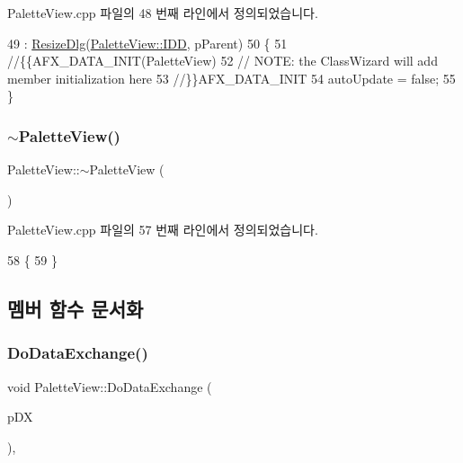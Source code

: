 Palette\+View.\+cpp 파일의 48 번째 라인에서 정의되었습니다.


\begin{DoxyCode}
49   : \mbox{\hyperlink{class_resize_dlg_a87bab778e9312f274ebe750d4c3a67ee}{ResizeDlg}}(\mbox{\hyperlink{class_palette_view_ac9e3b15a860a96ff9e01c7eb81030460a9cd7f0493230e0cee8b5dcc10a142e4d}{PaletteView::IDD}}, pParent)
50 \{
51   \textcolor{comment}{//\{\{AFX\_DATA\_INIT(PaletteView)}
52   \textcolor{comment}{// NOTE: the ClassWizard will add member initialization here}
53   \textcolor{comment}{//\}\}AFX\_DATA\_INIT}
54   autoUpdate = \textcolor{keyword}{false};
55 \}
\end{DoxyCode}
\mbox{\label{class_palette_view_a8b61805ccbde12bb0494801ec2b54c69}} 
\subsubsection{\texorpdfstring{$\sim$\+Palette\+View()}{~PaletteView()}}
{\footnotesize\ttfamily Palette\+View\+::$\sim$\+Palette\+View (\begin{DoxyParamCaption}{ }\end{DoxyParamCaption})}



Palette\+View.\+cpp 파일의 57 번째 라인에서 정의되었습니다.


\begin{DoxyCode}
58 \{
59 \}
\end{DoxyCode}


\subsection{멤버 함수 문서화}
\mbox{\label{class_palette_view_ab6773c354d2dbf71f320a37d58889b84}} 
\subsubsection{\texorpdfstring{Do\+Data\+Exchange()}{DoDataExchange()}}
{\footnotesize\ttfamily void Palette\+View\+::\+Do\+Data\+Exchange (\begin{DoxyParamCaption}\item[{C\+Data\+Exchange $\ast$}]{p\+DX }\end{DoxyParamCaption})\hspace{0.3cm}{\ttfamily [protected]}, {\ttfamily [virtual]}}




